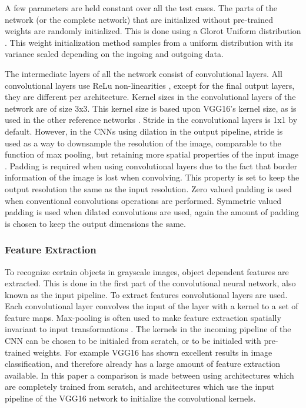 A few parameters are held constant over all the test cases. The parts of the network (or the complete network) that are initialized without pre-trained weights are randomly initialized. This is done using a Glorot Uniform distribution \cite{Glorot}. This weight initialization method samples from a uniform distribution with its variance scaled depending on the ingoing and outgoing data. 

The intermediate layers of all the network consist of convolutional layers. All convolutional layers use ReLu non-linearities \cite{nair2010rectified}, except for the final output layers, they are different per architecture. 
Kernel sizes in the convolutional layers of the network are of size 3x3. This kernel size is based upon VGG16's \cite{Simonyan} kernel size, as is used in the other reference networks \cite{Dahl}\cite{Zhang} \cite{ioffe2015batch}.
Stride in the convolutional layers is 1x1 by default. However, in the CNNs using dilation in the output pipeline, stride is used as a way to downsample the resolution of the image, comparable to the function of max pooling, but retaining more spatial properties of the input image \cite{yu2015multi}. Padding is required when using convolutional layers due to the fact that border information of the image is lost when convolving. This property is set to keep the output resolution the same as the input resolution. Zero valued padding is used when conventional convolutions operations are performed. Symmetric valued padding is used when dilated convolutions are used, again the amount of padding is chosen to keep the output dimensions the same.\\


\subsubsection{Feature Extraction}
To recognize certain objects in grayscale images, object dependent features are extracted. This is done in the first part of the convolutional neural network, also known as the input pipeline. To extract features convolutional layers are used. Each convolutional layer convolves the input of the layer with a kernel to a set of feature maps. Max-pooling is often used to make feature extraction spatially invariant to input transformations \cite{Simonyan}. The kernels in the incoming pipeline of the CNN can be chosen to be initialed from scratch, or to be initialed with pre-trained weights. For example VGG16 \cite{Simonyan} has shown excellent results in image classification, and therefore already has a large amount of feature extraction available. In this paper a comparison is made between using architectures which are completely trained from scratch, and architectures which use the input pipeline of the VGG16 network to initialize the convolutional kernels.\\


